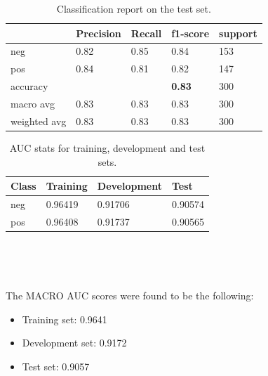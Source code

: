 \documentclass[10pt, a4paper]{article}
\begin{document}
	\begin{table}
		\begin{tabular}{|l|l|l|l|l|}
			\hline
			\cellcolor{blue!25}\textbf{} & \cellcolor{blue!25}\textbf{Precision} &
			\cellcolor{blue!25}\textbf{Recall}  &
			\cellcolor{blue!25}\textbf{f1-score}  &
			\cellcolor{blue!25}\textbf{support}\\
			\hline
			neg & 0.82 & 0.85 & 0.84 & 153 \\\hline
			pos & 0.84  & 0.81 & 0.82 & 147 \\\hline
			accuracy & & & \textbf{0.83} & 300 \\\hline
			macro avg & 0.83 & 0.83 & 0.83 & 300 \\\hline
			weighted avg & 0.83 & 0.83 & 0.83 & 300 \\\hline
			
		\end{tabular}
		\centering
		\caption{Classification report on the test set.}
		\label{tab::ex-1-report-test}
	\end{table}
	
	\begin{table}
		\begin{tabular}{|l|l|l|l|}
			\hline
			\cellcolor{blue!25}\textbf{Class} & \cellcolor{blue!25}\textbf{Training} & \cellcolor{blue!25}\textbf{Development} & \cellcolor{blue!25}\textbf{Test}\\
			\hline
			neg & 0.96419 & 0.91706 & 0.90574 \\\hline
			pos & 0.96408 & 0.91737 & 0.90565 \\\hline
			
		\end{tabular}
		\centering
		\caption{AUC stats for training, development and test sets.}
		\label{tab::ex-1-stats-auc}
	\end{table}
	\ 
	
	
	
	\
	
	The MACRO AUC scores were found to be the following:
	\begin{itemize}
		\item Training set: 0.9641
		\item Development set: 0.9172
		\item Test set: 0.9057
	\end{itemize}
	
	\printbibliography
	
\end{document}

